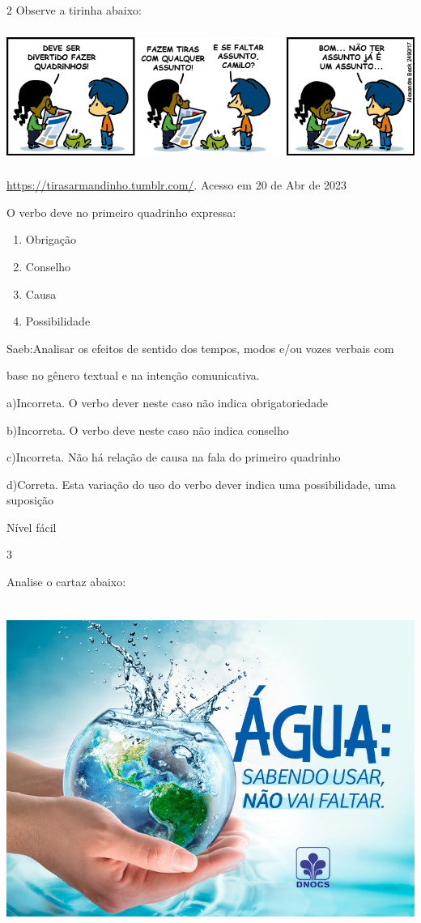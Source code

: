 {{\begin{escolha}
\num{2}
Observe a tirinha abaixo:

\includegraphics[width=5.90551in,height=1.70833in]{./imgSAEB_7_POR/media/image12.png}

\href{https://tirasarmandinho.tumblr.com/}{\uline{https://tirasarmandinho.tumblr.com/}}.
Acesso em 20 de Abr de 2023

O verbo deve no primeiro quadrinho expressa:

\begin{enumerate}
\def\labelenumi{\alph{enumi})}
\item
  Obrigação
\item
  Conselho
\item
  Causa
\item
  Possibilidade
\end{enumerate}

Saeb:Analisar os efeitos de sentido dos tempos, modos e/ou vozes verbais
com

base no gênero textual e na intenção comunicativa.

a)Incorreta. O verbo dever neste caso não indica obrigatoriedade

b)Incorreta. O verbo deve neste caso não indica conselho

c)Incorreta. Não há relação de causa na fala do primeiro quadrinho

d)Correta. Esta variação do uso do verbo dever indica uma possibilidade,
uma suposição

Nível fácil

\num{3}

Analise o cartaz abaixo:

\includegraphics[width=5.90551in,height=4.29167in]{./imgSAEB_7_POR/media/image13.png}


\end{escolha}}}
